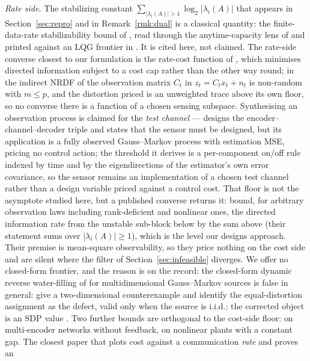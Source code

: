 \documentclass[journal]{IEEEtran}
\theoremstyle{remark}
\begin{document}
\emph{Rate side.} The stabilizing constant
$\sum_{|\lambda_i(A)|>1}\log_2|\lambda_i(A)|$ that appears in
Section~\ref{sec:repro} and in Remark~\ref{rmk:dual} is a classical quantity: the
finite-data-rate stabilizability bound of \cite{nair2004stabilizability}, read
through the anytime-capacity lens of \cite{sahai2006anytime} and printed against an
LQG frontier in \cite{sabag2021reducing}. It is cited here, not claimed. The
rate-side converse closest to our formulation is the rate-cost function of
\cite{kostina2019rate},
which minimises directed information subject to a cost cap rather than the other
way round; in the indirect NRDF of \cite{stavrou2019indirect} the observation
matrix $C_t$ in $z_t=C_tx_t+n_t$ is non-random with $m\le p$, and the distortion
priced is an unweighted trace above its own floor, so no converse there is a
function of a chosen sensing subspace. Synthesising an observation process is
claimed for the \emph{test channel} --- \cite{stavrou2016estimation} designs the
encoder--channel--decoder triple and states that the sensor must be designed,
but its application is a fully observed Gauss--Markov process with estimation MSE,
pricing no control action; the threshold it derives is a per-component on/off rule
indexed by time and by the eigendirections of the estimator's own error covariance,
so the sensor remains an implementation of a chosen test channel rather than a
design variable priced against a control cost. That floor is not the asymptote studied here, but a
published converse returns it: \cite{li2026sensing} bound, for arbitrary
observation laws including rank-deficient and nonlinear ones, the directed
information rate from the unstable sub-block below by the sum above (their
statement sums over $|\lambda_i(A)|\ge1$), which is the level our designs
approach. Their premise is mean-square observability, so they price nothing on the
cost side and are silent where the filter of Section~\ref{sec:infeasible}
diverges. We offer no closed-form frontier, and the reason is on the record: the
closed-form dynamic reverse water-filling of \cite{tatikonda2004stochastic} for
multidimensional Gauss--Markov sources is false in general:
\cite{stavrou2017revisited} give a two-dimensional counterexample and identify the
equal-distortion assignment as the defect, valid only when the source is i.i.d.;
the corrected object is an SDP value \cite{tanaka2017srd}. Two further bounds are
orthogonal to the cost-side floor: \cite{li2026lower} on multi-encoder networks
without feedback, \cite{atay2026rate} on nonlinear plants with a constant gap. The
closest paper that plots cost against a communication \emph{rate} and proves an
\end{document}
